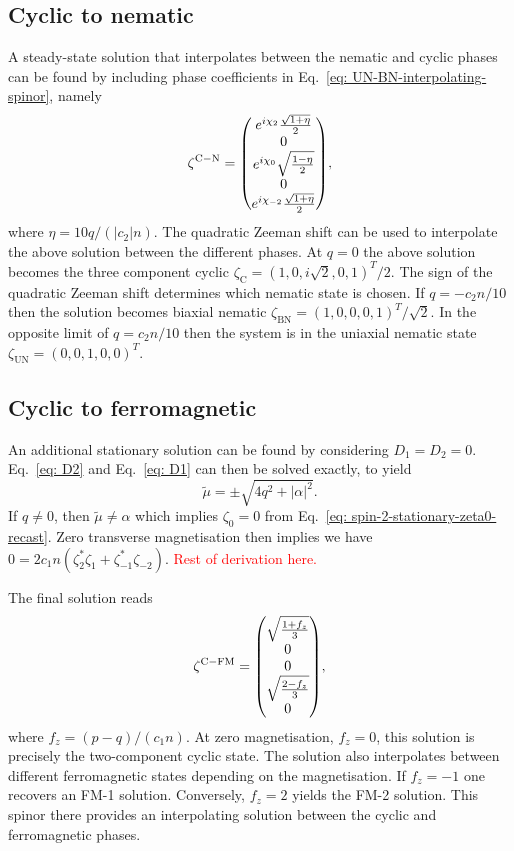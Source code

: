 \subsection{Cyclic to nematic}
A steady-state solution that interpolates between the nematic and cyclic phases
can be found by including phase coefficients in
Eq.~\eqref{eq: UN-BN-interpolating-spinor}, namely
\begin{equation}\label{eq: C-N-interpolating-spinor}
    \zeta^\mathrm{C-N} = \mqty(
    e^{i\chi_2}\frac{\sqrt{1 + \eta}}{2} \\
    0 \\
    e^{i\chi_0}\sqrt{\frac{1 - \eta}{2}} \\
    0 \\
    e^{i\chi_{-2}}\frac{\sqrt{1 + \eta}}{2}),
\end{equation}
where \(\eta = 10q/(|c_2|n)\).
The quadratic Zeeman shift can be used to interpolate the above solution between
the different phases.
At \(q = 0\) the above solution becomes the three component cyclic
\(\zeta_\mathrm{C} = {(1, 0, i\sqrt{2}, 0, 1)}^T/2\).
The sign of the quadratic Zeeman shift determines which nematic state is chosen.
If \(q = -c_2n/10\) then the solution becomes biaxial nematic
\(\zeta_\mathrm{BN} = {(1, 0, 0, 0, 1)}^T/\sqrt{2}\).
In the opposite limit of \(q = c_2n/10\) then the system is in the uniaxial
nematic state \(\zeta_\mathrm{UN} = {(0, 0, 1, 0, 0)}^T\).

\subsection{Cyclic to ferromagnetic}
An additional stationary solution can be found by considering \(D_1=D_2=0\).
Eq.~\eqref{eq: D2} and Eq.~\eqref{eq: D1} can then be solved exactly, to yield
\begin{equation}
    \tilde{\mu} = \pm \sqrt{4q^2 + |\alpha|^2}.
\end{equation}
If \(q \neq 0\), then \(\tilde{\mu} \neq \alpha \) which implies \(\zeta_0=0\)
from Eq.~\eqref{eq: spin-2-stationary-zeta0-recast}.
Zero transverse magnetisation then implies we have
\(0 = 2c_1n(\zeta_2^*\zeta_{1} + \zeta_{-1}^*\zeta_{-2})\).
\textcolor{red}{Rest of derivation here.}

The final solution reads
\begin{equation}
    \zeta^\mathrm{C-FM} = \mqty(\sqrt{\frac{1 + f_z}{3}} \\ 0 \\ 0 \\
    \sqrt{\frac{2 - f_z}{3}} \\ 0),
\end{equation}
where \(f_z = (p - q) / (c_1n)\).
At zero magnetisation, \(f_z = 0\), this solution is precisely the two-component
cyclic state.
The solution also interpolates between different ferromagnetic states depending
on the magnetisation.
If \(f_z = -1\) one recovers an FM-1 solution.
Conversely, \(f_z = 2\) yields the FM-2 solution.
This spinor there provides an interpolating solution between the cyclic and
ferromagnetic phases.

